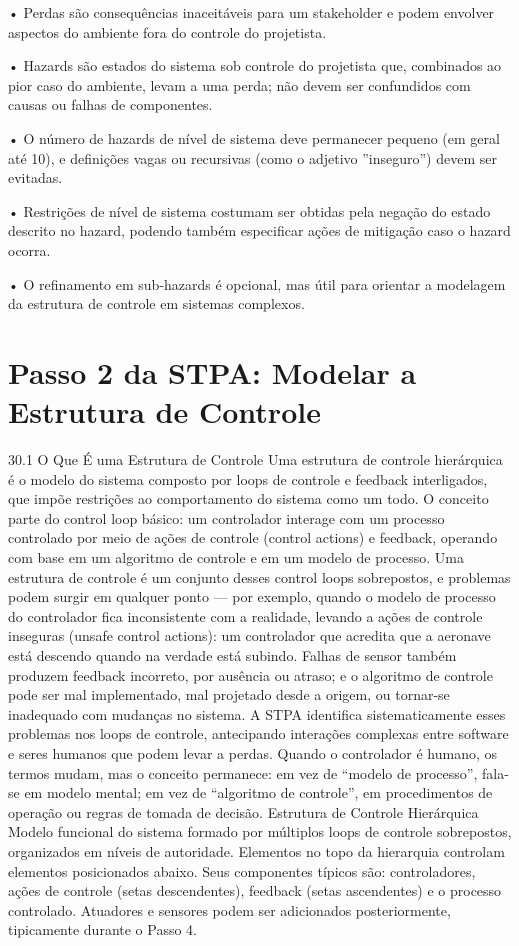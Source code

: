 • Perdas são consequências inaceitáveis para um stakeholder e podem envolver aspectos do ambiente fora do controle do projetista.

• Hazards são estados do sistema sob controle do projetista que, combinados ao pior caso do ambiente, levam a uma perda; não devem ser confundidos com causas ou falhas de componentes.

• O número de hazards de nível de sistema deve permanecer pequeno (em geral até 10), e definições vagas ou recursivas (como o adjetivo ”inseguro”) devem ser evitadas.

• Restrições de nível de sistema costumam ser obtidas pela negação do estado descrito no hazard, podendo também especificar ações de mitigação caso o hazard ocorra.

• O refinamento em sub-hazards é opcional, mas útil para orientar a modelagem da estrutura de controle em sistemas complexos.

\chapter{Passo 2 da STPA: Modelar a Estrutura de Controle}

30.1 O Que É uma Estrutura de Controle Uma estrutura de controle hierárquica é o modelo do sistema composto por loops de controle e feedback interligados, que impõe restrições ao comportamento do sistema como um todo. O conceito parte do control loop básico: um controlador interage com um processo controlado por meio de ações de controle (control actions) e feedback, operando com base em um algoritmo de controle e em um modelo de processo. Uma estrutura de controle é um conjunto desses control loops sobrepostos, e problemas podem surgir em qualquer ponto — por exemplo, quando o modelo de processo do controlador fica inconsistente com a realidade, levando a ações de controle inseguras (unsafe control actions): um controlador que acredita que a aeronave está descendo quando na verdade está subindo. Falhas de sensor também produzem feedback incorreto, por ausência ou atraso; e o algoritmo de controle pode ser mal implementado, mal projetado desde a origem, ou tornar-se inadequado com mudanças no sistema. A STPA identifica sistematicamente esses problemas nos loops de controle, antecipando interações complexas entre software e seres humanos que podem levar a perdas. Quando o controlador é humano, os termos mudam, mas o conceito permanece: em vez de “modelo de processo”, fala-se em modelo mental; em vez de “algoritmo de controle”, em procedimentos de operação ou regras de tomada de decisão. Estrutura de Controle Hierárquica Modelo funcional do sistema formado por múltiplos loops de controle sobrepostos, organizados em níveis de autoridade. Elementos no topo da hierarquia controlam elementos posicionados abaixo. Seus componentes típicos são: controladores, ações de controle (setas descendentes), feedback (setas ascendentes) e o processo controlado. Atuadores e sensores podem ser adicionados posteriormente, tipicamente durante o Passo 4.

